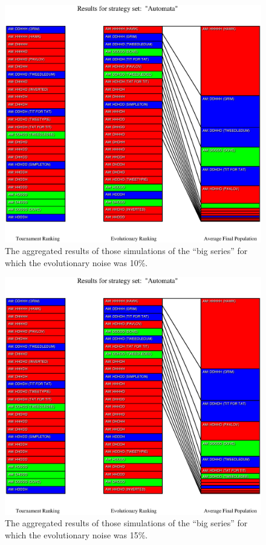 \begin{figure}
\begin{center}
\includegraphics[width=20cm]{tables/Automata_N0.100.eps}
\caption{\label{Automata_N0100} The aggregated results of those
simulations of the ``big series'' for which the evolutionary noise was 10\%.}
\end{center}
\end{figure}

\begin{figure}
\begin{center}
\includegraphics[width=20cm]{tables/Automata_N0.150.eps}
\caption{\label{Automata_N0150} The aggregated results of those
simulations of the ``big series'' for which the evolutionary noise was 15\%.}
\end{center}
\end{figure}


